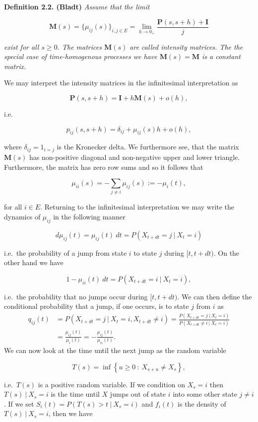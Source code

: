 \documentclass[a4paper,12pt,openany]{book}
\begin{document}
\textbf{Definition 2.2. (Bladt)} \emph{Assume that the limit}

\[
\mathbf{M}(s)=\big\{\mu_{ij}(s)\big\}_{i,j\in E}=\lim_{h\to 0_+}\frac{\mathbf{P}(s,s+h)+\mathbf{I}}{j}
\]

\emph{exist for all \(s\ge 0\). The matrices \(\mathbf{M}(s)\) are called intensity matrices. The the special case of time-homogenous processes we have \(\mathbf{M}(s)=\mathbf{M}\) is a constant matrix. }

We may interpret the intensity matrices in the infinitesimal interpretation as

\[
\mathbf{P}(s,s+h) = \mathbf{I}+h\mathbf{M}(s)+o(h),
\]

i.e.

\[
p_{ij}(s,s+h)=\delta_{ij}+\mu_{ij}(s)h+o(h),
\]

where \(\delta_{ij}=1_{i=j}\) is the Kronecker delta. We furthermore see, that the matrix \(\mathbf{M}(s)\) has non-positive diagonal and non-negative upper and lower triangle. Furthermore, the matrix has zero row sums and so it follows that

\[
\mu_{ii}(s)=-\sum_{j\ne i}\mu_{ij}(s):=-\mu_{i}(t),
\]

for all \(i\in E\). Returning to the infinitesimal interpretation we may write the dynamics of \(\mu_{ij}\) in the following manner

\[
d\mu_{ij}(t)=\mu_{ij}(t)\ dt=P(X_{t+dt}=j\ \vert\ X_t=i)
\]

i.e.~the probability of a jump from state \(i\) to state \(j\) during \([t,t+dt)\). On the other hand we have

\[
1-\mu_{ii}(t)\ dt=P(X_{t+dt}=i\ \vert\ X_t=i),
\]

i.e.~the probability that no jumps occur during \([t,t+dt)\). We can then define the conditional probability that a jump, if one occurs, is to state \(j\) from \(i\) as
\begin{align*}
q_{ij}(t)&=P(X_{t+dt}=j\ \vert\  X_t=i,X_{t+dt}\ne i)=\frac{P(X_{t+dt}=j\ \vert\  X_t=i)}{P(X_{t+dt}\ne i\ \vert\  X_t=i)}\\
&=\frac{\mu_{ij}(t)}{\mu_i(t)}=-\frac{\mu_{ij}(t)}{\mu_{ii}(t)}.
\end{align*}
We can now look at the time until the next jump as the random variable

\[
T(s)=\inf\left\{u\ge 0\ :\ X_{s+u}\ne X_s\right\},
\]

i.e.~\(T(s)\) is a positive random variable. If we condition on \(X_s=i\) then \(T(s)\ \vert\ X_s=i\) is the time until \(X\) jumps out of state \(i\) into some other state \(j\ne i\). If we set \(S_i(t)=P(T(s)>t\ \vert\ X_s=i)\) and \(f_i(t)\) is the density of \(T(s)\ \vert\ X_s=i\), then we have
\end{document}
